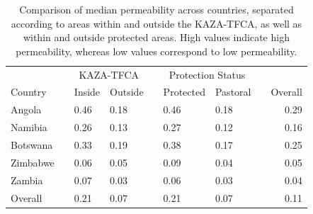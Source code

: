 \documentclass[abstract=on,10pt,a4paper,bibliography=totocnumbered]{scrartcl}
\begin{document}

\begin{table}[h]
  \caption{Comparison of median permeability across countries, separated
  according to areas within and outside the KAZA-TFCA, as well as within and
  outside protected areas. High values indicate high permeability, whereas low
  values correspond to low permeability.}
  \label{PermeabilityComp}
  \begin{center}
    \resizebox{\textwidth}{!} {
      \begin{tabular}{llllllllr}
      & & \multicolumn{2}{c}{KAZA-TFCA} && \multicolumn{2}{c}{Protection Status} \\
      \cline{3-4} \cline{6-7}
      Country & & Inside & Outside & & Protected & Pastoral & & Overall \\
      \hline
      Angola & & 0.46 & 0.18 & & 0.46 & 0.18 & & 0.29 \\
      Namibia & & 0.26 & 0.13 & & 0.27 & 0.12 & & 0.16 \\
      Botswana & & 0.33 & 0.19 & & 0.38 & 0.17 & & 0.25 \\
      Zimbabwe & & 0.06 & 0.05 & & 0.09 & 0.04 & & 0.05 \\
      Zambia & & 0.07 & 0.03 & & 0.06 & 0.03 & & 0.04 \\
      \hline
      Overall & & 0.21 & 0.07 & & 0.21 & 0.07 & & 0.11 \\
      \end{tabular}
    }
  \end{center}
\end{table}
\end{document}
